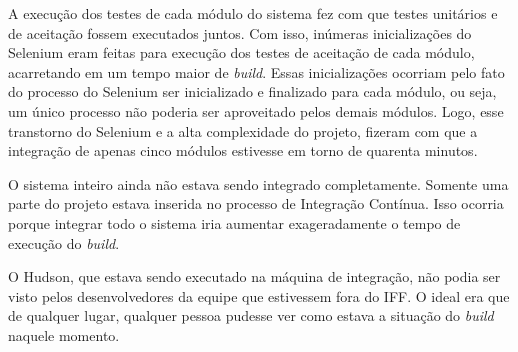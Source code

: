 A execução dos testes de cada módulo do sistema fez com que testes unitários e de aceitação fossem executados juntos. Com isso, inúmeras inicializações do Selenium eram feitas para execução dos testes de aceitação de cada módulo, acarretando em um tempo maior de \textit{build}. Essas inicializações ocorriam pelo fato do processo do Selenium ser inicializado e finalizado para cada módulo, ou seja, um único processo não poderia ser aproveitado pelos demais módulos. Logo, esse transtorno do Selenium e a alta complexidade do projeto, fizeram com que a integração de apenas cinco módulos estivesse em torno de quarenta minutos.

O sistema inteiro ainda não estava sendo integrado completamente. Somente uma parte do projeto estava inserida no processo de Integração Contínua. Isso ocorria porque integrar todo o sistema iria aumentar exageradamente o tempo de execução do \textit{build}.

O Hudson, que estava sendo executado na máquina de integração, não podia ser visto pelos desenvolvedores da equipe que estivessem fora do IFF. O ideal era que de qualquer lugar, qualquer pessoa pudesse ver como estava a situação do \textit{build} naquele momento.


